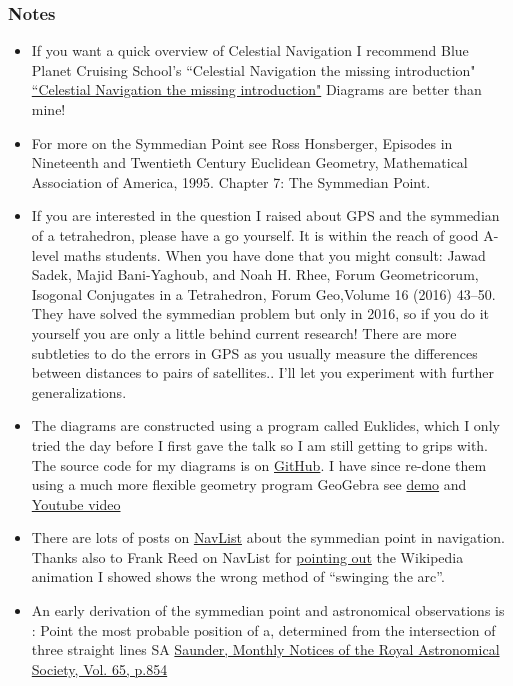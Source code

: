 \documentclass{beamer}
\begin{document}
\begin{frame}\frametitle{Notes}
\tiny
\begin{itemize}
\item If you want a quick overview of Celestial Navigation I recommend Blue Planet Cruising School's ``Celestial Navigation the missing introduction" \href{http://www.blueplanetcruisingschool.com/celestial-navigation-the-missing-introduction/}{``Celestial Navigation the missing introduction"} Diagrams are better than mine!
\item For more on the Symmedian Point see Ross Honsberger, Episodes in Nineteenth and Twentieth Century Euclidean Geometry, Mathematical Association of America, 1995. Chapter 7: The Symmedian Point. 
\item If you are interested in the question I raised about GPS and the symmedian of a tetrahedron, please have a go yourself. It is within the reach of good A-level maths students. When you have done that you might consult: Jawad Sadek, Majid Bani-Yaghoub, and Noah H. Rhee, Forum Geometricorum, Isogonal Conjugates in a Tetrahedron,
Forum Geo,Volume 16 (2016) 43–50. They have solved the symmedian problem but only in 2016, so if you do it yourself you are only a little behind current research! There are more subtleties to do the errors in GPS as you usually measure the differences between distances to pairs of satellites.. I'll let you experiment with further generalizations.
\item The diagrams are constructed using a program called Euklides, which I only tried the day before I first gave the talk so I am still getting to grips with. The source code for my diagrams is on \href{https://github.com/billlion/symmedian-talk}{GitHub}. I have since re-done them using a much more flexible geometry program GeoGebra see \href{https://www.geogebra.org/material/show/id/xzMrFwzf}{demo} and \href{https://www.youtube.com/watch?v=IXjagimXuv8}{Youtube video} 
\item There are lots of posts on \href{http://fer3.com/arc/m2.aspx/Finding-Symmedian-PeterFogg-dec-2010-g15003}{NavList} about the symmedian point in navigation. Thanks also to Frank Reed on NavList for \href{http://fer3.com/arc/m2.aspx/Swinging-Arc-FrankReed-oct-2005-w26060}{pointing out} the Wikipedia animation I showed shows the wrong method of ``swinging the arc''.
\item An early derivation of the symmedian point and astronomical observations is : Point the most probable position of a, determined from the intersection of three straight lines SA \href{http://adsabs.harvard.edu/full/1905MNRAS..65..854S}{Saunder,  Monthly Notices of the Royal Astronomical Society, Vol. 65, p.854}

\end{itemize}
\end{frame}
\end{document}

